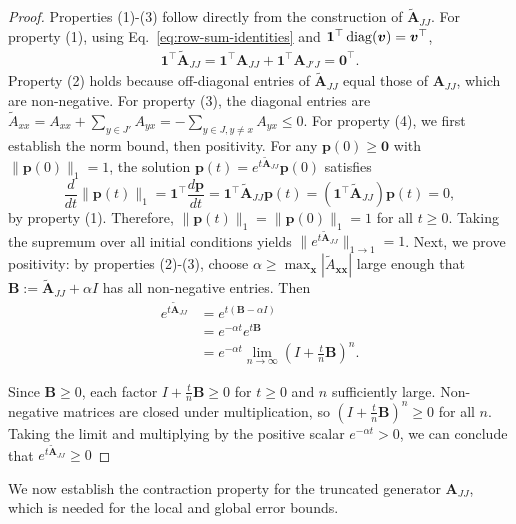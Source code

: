 \documentclass[review,onefignum,onetabnum]{siamart171218}
\begin{document}
\begin{proof}
Properties (1)-(3) follow directly from the construction of $\widetilde{\mathbf{A}}_{JJ}$. For property (1), using Eq.~\eqref{eq:row-sum-identities} and $\mathbf{1}^\top \operatorname{diag}(\boldsymbol{v}) = \boldsymbol{v}^\top$,
\begin{align*}
\mathbf{1}^\top \widetilde{\mathbf{A}}_{JJ} = \mathbf{1}^\top \mathbf{A}_{JJ} + \mathbf{1}^\top \mathbf{A}_{J'J} = \mathbf{0}^\top.
\end{align*}
Property (2) holds because off-diagonal entries of $\widetilde{\mathbf{A}}_{JJ}$ equal those of $\mathbf{A}_{JJ}$, which are non-negative. For property (3), the diagonal entries are $\widetilde{A}_{xx} = A_{xx} + \sum_{y \in J'} A_{yx} = - \sum_{y \in J, y \neq x} A_{yx} \leq 0$. For property (4), we first establish the norm bound, then positivity. For any $\boldsymbol{p}(0) \geq \mathbf{0}$ with $\|\boldsymbol{p}(0)\|_1 = 1$, the solution $\boldsymbol{p}(t) = e^{t\widetilde{\mathbf{A}}_{JJ}}\boldsymbol{p}(0)$ satisfies
\begin{equation}
\frac{d}{dt}\|\boldsymbol{p}(t)\|_1 = \mathbf{1}^\top \frac{d\boldsymbol{p}}{dt} = \mathbf{1}^\top \widetilde{\mathbf{A}}_{JJ}\boldsymbol{p}(t) = (\mathbf{1}^\top \widetilde{\mathbf{A}}_{JJ})\boldsymbol{p}(t) = 0,
\end{equation}
by property (1). Therefore, $\|\boldsymbol{p}(t)\|_1 = \|\boldsymbol{p}(0)\|_1 = 1$ for all $t \geq 0$. Taking the supremum over all initial conditions yields $\|e^{t\widetilde{\mathbf{A}}_{JJ}}\|_{1 \to 1} = 1$. Next, we prove positivity: by properties (2)-(3), choose $\alpha \geq \max_{\boldsymbol{x}} |\widetilde{A}_{\boldsymbol{x}\boldsymbol{x}}|$ large enough that $\mathbf{B} := \widetilde{\mathbf{A}}_{JJ} + \alpha I$ has all non-negative entries. Then
\begin{align*}
e^{t\widetilde{\mathbf{A}}_{JJ}} &= e^{t(\mathbf{B} - \alpha I)} \\
                        &= e^{-\alpha t} e^{t\mathbf{B}} \\
                        &= e^{-\alpha t} \lim_{n \to \infty} \left(I + \frac{t}{n}\mathbf{B}\right)^n.
\end{align*}

Since $\mathbf{B} \geq 0$, each factor $I + \frac{t}{n}\mathbf{B} \geq 0$ for $t \geq 0$ and $n$ sufficiently large. Non-negative matrices are closed under multiplication, so $(I + \frac{t}{n}\mathbf{B})^n \geq 0$ for all $n$. Taking the limit and multiplying by the positive scalar $e^{-\alpha t} > 0$, we can conclude that $e^{t\widetilde{\mathbf{A}}_{JJ}} \geq 0$
\end{proof}
We now establish the contraction property for the truncated generator $\mathbf{A}_{JJ}$, which is needed for the local and global error bounds.
\end{document}
